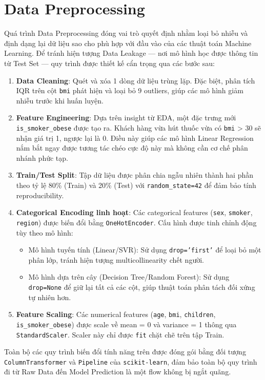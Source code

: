 \section{Data Preprocessing}

Quá trình Data Preprocessing đóng vai trò quyết định nhằm loại bỏ nhiễu và định dạng lại dữ liệu sao cho phù hợp với đầu vào của các thuật toán Machine Learning. Để tránh hiện tượng Data Leakage — nơi mô hình học được thông tin từ Test Set — quy trình được thiết kế cẩn trọng qua các bước sau:

\begin{enumerate}
    \item \textbf{Data Cleaning}: Quét và xóa 1 dòng dữ liệu trùng lặp. Đặc biệt, phân tích IQR trên cột \texttt{bmi} phát hiện và loại bỏ 9 outliers, giúp các mô hình giảm nhiễu trước khi huấn luyện.
    \item \textbf{Feature Engineering}: Dựa trên insight từ EDA, một đặc trưng mới \texttt{is\_smoker\_obese} được tạo ra. Khách hàng vừa hút thuốc vừa có \texttt{bmi} > 30 sẽ nhận giá trị 1, ngược lại là 0. Điều này giúp các mô hình Linear Regression nắm bắt ngay được tương tác chéo cực độ này mà không cần cơ chế phân nhánh phức tạp.
    \item \textbf{Train/Test Split}: Tập dữ liệu được phân chia ngẫu nhiên thành hai phần theo tỷ lệ 80\% (Train) và 20\% (Test) với \texttt{random\_state=42} để đảm bảo tính reproducibility.
    \item \textbf{Categorical Encoding linh hoạt}: Các categorical features (\texttt{sex}, \texttt{smoker}, \texttt{region}) được biến đổi bằng \texttt{OneHotEncoder}. Cấu hình được tinh chỉnh động tùy theo mô hình:
    \begin{itemize}
        \item Mô hình tuyến tính (Linear/SVR): Sử dụng \texttt{drop='first'} để loại bỏ một phân lớp, tránh hiện tượng multicollinearity chết người.
        \item Mô hình dựa trên cây (Decision Tree/Random Forest): Sử dụng \texttt{drop=None} để giữ lại tất cả các cột, giúp thuật toán phân tách đối xứng tự nhiên hơn.
    \end{itemize}
    \item \textbf{Feature Scaling}: Các numerical features (\texttt{age}, \texttt{bmi}, \texttt{children}, \texttt{is\_smoker\_obese}) được scale về mean = 0 và variance = 1 thông qua \texttt{StandardScaler}. Scaler này chỉ được \texttt{fit} chặt chẽ trên tập Train.
\end{enumerate}

Toàn bộ các quy trình biến đổi tính năng trên được đóng gói bằng đối tượng \texttt{ColumnTransformer} và \texttt{Pipeline} của \texttt{scikit-learn}, đảm bảo toàn bộ quy trình đi từ Raw Data đến Model Prediction là một flow không bị ngắt quãng.
